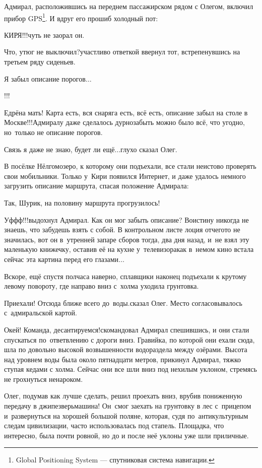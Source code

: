 Адмирал, расположившись на переднем пассажирском рядом с Олегом, включил прибор GPS\footnote{Global Positioning System --- спутниковая система навигации.}. И вдруг его прошиб холодный пот:

\diagdash КИРЯ!!!\mdash чуть не заорал он.

\diagdash Что, утюг не выключил?\mdash участливо ответкой ввернул тот, встрепенувшись на третьем ряду сиденьев.

\diagdash Я забыл описание порогов$\ldots$

\diagdash !!!

\diagdash Едрёна мать! Карта есть, вся снаряга есть, всё есть, описание забыл на столе в Москве!!!\mdash Адмиралу даже сделалось дурно\mdash забыть можно было всё, что угодно, но~только не описание порогов. 

\diagdash Связь я даже не знаю, будет ли ещё$\ldots$\mdash глухо сказал Олег.

В посёлке Нёлгомозеро, к которому они подъехали, все стали неистово проверять свои мобильники. Только у~Кири появился Интернет, и даже удалось немного загрузить описание маршрута, спасая положение Адмирала:

\diagdash Так, Шурик, на половину маршрута прогрузилось!

\diagdash Уф\sdash ф\sdash ф!!!\mdash выдохнул Адмирал. Как он мог забыть описание? Воистину никогда не знаешь, что забудешь взять с собой. В контрольном листе лоция отчего\sdash то не значилась, вот он в~утренней запаре сборов тогда, два дня назад, и~не взял эту маленькую книжечку, оставив её на кухне у~телевизора\mdash как в~немом кино встала сейчас эта картина перед его глазами$\ldots$

\newpage
Вскоре, ещё спустя полчаса наверно, сплавщики наконец подъехали к крутому левому повороту, где направо вниз с~холма уходила грунтовка. 

\diagdash Приехали! Отсюда ближе всего до~воды.\mdash сказал Олег. Место согласовывалось с~адмиральской картой. 

\diagdash Окей! Команда, десантируемся!\mdash скомандовал Адмирал спешившись, и они стали спускаться по~ответвлению с дороги вниз. Гравийка, по которой они ехали сюда, шла по довольно высокой возвышенности водораздела между озёрами. Высота над уровнем воды была около пятнадцати метров, прикинул Адмирал, тяжко ступая кедами с холма. Сейчас они все шли вниз под нехилым уклоном, стремясь не грохнуться ненароком.

Олег, подумав как лучше сделать, решил проехать вниз, врубив пониженную передачу в джипе\mdash зверь\nobreakdash\sdash\nobreakdash машина! Он~смог заехать на грунтовку в лес с~прицепом и~развернуться на хорошей большой поляне, которая, судя по~антикультурным следам цивилизации, часто использовалась под стапель. Площадка, что интересно, была почти ровной, но до и после неё уклоны уже шли приличные.

